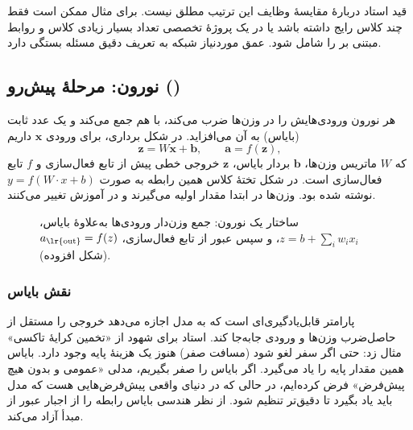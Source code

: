 \begin{exambox}{قید استاد دربارهٔ مقایسهٔ وظایف}
این ترتیب مطلق نیست. برای مثال  ممکن است فقط چند کلاس رایج داشته باشد یا در یک پروژهٔ تخصصی تعداد بسیار زیادی کلاس و روابط مبتنی بر  را شامل شود. عمق موردنیاز شبکه به تعریف دقیق مسئله بستگی دارد.
\end{exambox}

\subsection{نورون: مرحلهٔ پیش‌رو ()}
هر نورون ورودی‌هایش را در وزن‌ها ضرب می‌کند، با هم جمع می‌کند و یک عدد ثابت (بایاس) به آن می‌افزاید. در شکل برداری، برای ورودی $\mathbf{x}$ داریم
\[
\mathbf{z}=W\mathbf{x}+\mathbf{b},\qquad \mathbf{a}=f(\mathbf{z}),
\]
که $W$ ماتریس وزن‌ها، $\mathbf{b}$ بردار بایاس، $\mathbf{z}$ خروجی خطی پیش از تابع فعال‌سازی و $f$ تابع فعال‌سازی است. در شکل تختهٔ کلاس همین رابطه به صورت $y=f(W\cdot x+b)$ نوشته شده بود. وزن‌ها در ابتدا مقدار اولیه می‌گیرند و در آموزش تغییر می‌کنند.

\begin{figure}[htbp]
\centering
{}
\caption{ساختار یک نورون: جمع وزن‌دار ورودی‌ها به‌علاوهٔ بایاس، $z=b+\sum_i w_ix_i$، و سپس عبور از تابع فعال‌سازی، $a_{\text{\lr{out}}}=f(z)$ (شکل افزوده).}
\end{figure}

\subsubsection{نقش بایاس}
 پارامتر قابل‌یادگیری‌ای است که به مدل اجازه می‌دهد خروجی را مستقل از حاصل‌ضرب وزن‌ها و ورودی جابه‌جا کند. استاد برای شهود از «تخمین کرایهٔ تاکسی» مثال زد: حتی اگر سفر لغو شود (مسافت صفر) هنوز یک هزینهٔ پایه وجود دارد. بایاس همین مقدار پایه را یاد می‌گیرد. اگر بایاس را صفر بگیریم، مدلی «عمومی و بدون هیچ پیش‌فرض» فرض کرده‌ایم، در حالی که در دنیای واقعی پیش‌فرض‌هایی هست که مدل باید یاد بگیرد تا دقیق‌تر تنظیم شود. از نظر هندسی بایاس رابطه را از اجبار عبور از مبدأ آزاد می‌کند.

